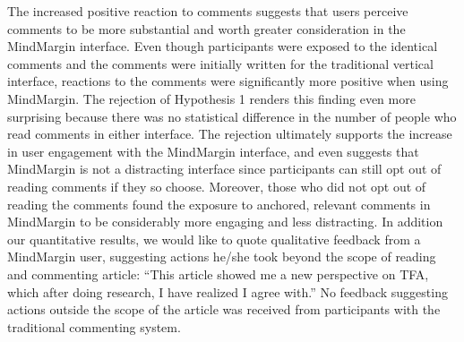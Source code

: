 The increased positive reaction to comments suggests that users perceive comments to be more substantial and worth greater consideration in the MindMargin interface. Even though participants were exposed to the identical comments and the comments were initially written for the traditional vertical interface, reactions to the comments were significantly more positive when using MindMargin. The rejection of Hypothesis 1 renders this finding even more surprising because there was no statistical difference in the number of people who read comments in either interface. The rejection ultimately supports the increase in user engagement with the MindMargin interface, and even suggests that MindMargin is not a distracting interface since participants can still opt out of reading comments if they so choose. Moreover, those who did not opt out of reading the comments found the exposure to anchored, relevant comments in MindMargin to be considerably more engaging and less distracting. In addition our quantitative results, we would like to quote qualitative feedback from a MindMargin user, suggesting actions he/she took beyond the scope of reading and commenting article: “This article showed me a new perspective on TFA, which after doing research, I have realized I agree with.” No feedback suggesting actions outside the scope of the article was received from participants with the traditional commenting system. 